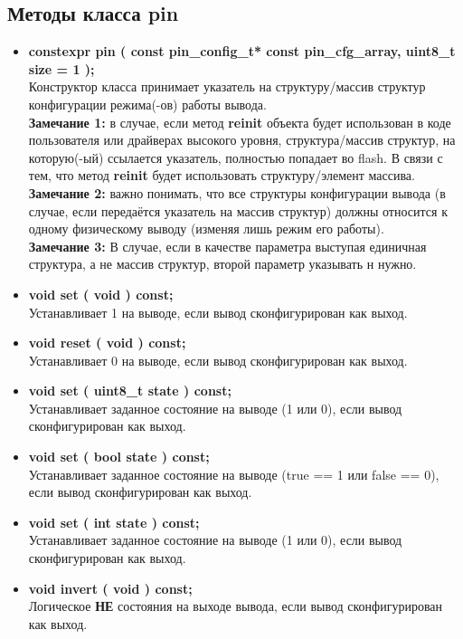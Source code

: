 \subsection{Методы класса pin}
\begin{itemize}
	\item \textbf{constexpr pin ( const pin\_config\_t* const pin\_cfg\_array,  uint8\_t size = 1 );}\\Конструктор класса принимает указатель на структуру/массив структур конфигурации режима(-ов) работы  вывода.\\\textbf{Замечание 1: } в случае, если метод \textbf{reinit} объекта будет использован в коде пользователя или драйверах высокого уровня, структура/массив структур, на которую(-ый) ссылается указатель, полностью попадает во flash. В связи с тем, что метод \textbf{reinit} будет использовать структуру/элемент массива.
	\\\textbf{Замечание 2: }важно понимать, что все структуры конфигурации вывода (в случае, если передаётся указатель на массив структур) должны относится к одному физическому выводу (изменяя лишь режим его работы).
	\\\textbf{Замечание 3: }В случае, если в качестве параметра выступая единичная структура, а не массив структур, второй параметр указывать н нужно.
	\item \textbf{void	set		( void ) const;}\\Устанавливает 1 на выводе, если вывод сконфигурирован как выход.
	\item \textbf{void	reset	( void ) const;}\\Устанавливает 0 на выводе, если вывод сконфигурирован как выход.
	\item \textbf{void	set		( uint8\_t state ) const;}\\Устанавливает заданное состояние на выводе (1 или 0), если вывод сконфигурирован как выход.
	\item \textbf{void	set		( bool state ) const;}\\Устанавливает заданное состояние на выводе (true == 1 или false == 0), если вывод сконфигурирован как выход.
	\item \textbf{void	set		( int state ) const;}\\Устанавливает заданное состояние на выводе (1 или 0), если вывод сконфигурирован как выход.
	\item \textbf{void	invert	( void ) const;}\\Логическое \textbf{НЕ} состояния на выходе вывода, если вывод сконфигурирован как выход.

\end{itemize}
